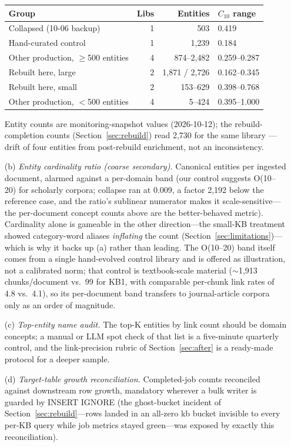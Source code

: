 \documentclass[preprint,12pt]{elsarticle}
\begin{document}
\begin{itemize}
\begin{center}
\small
\begin{tabular}{@{}lrrl@{}}
\toprule
Group & Libs & Entities & $C_{10}$ range \\
\midrule
Collapsed (10-06 backup) & 1 & 503 & 0.419 \\
Hand-curated control & 1 & 1{,}239 & 0.184 \\
Other production, $\geq$500 entities & 4 & 874--2{,}482 & 0.259--0.287 \\
Rebuilt here, large & 2 & 1{,}871 / 2{,}726 & 0.162--0.345 \\
Rebuilt here, small & 2 & 153--629 & 0.398--0.768 \\
Other production, $<$500 entities & 4 & 5--424 & 0.395--1.000 \\
\bottomrule
\end{tabular}
\begin{flushleft}\footnotesize Entity counts are monitoring-snapshot
values (2026-10-12); the rebuild-completion counts
(Section~\ref{sec:rebuild}) read 2{,}730 for the same library ---
drift of four entities from post-rebuild enrichment, not an
inconsistency.
\end{flushleft}
\end{center}

\item[(b)] \emph{Entity cardinality ratio (coarse secondary).} Canonical
entities per ingested document, alarmed against a per-domain band (our
control suggests O(10--20) for scholarly corpora; collapse ran at 0.009, a factor 2{,}192 below the reference
case, and the ratio's sublinear numerator makes it scale-sensitive---the
per-document concept counts above are the better-behaved metric).
Cardinality alone is gameable in the other direction---the small-KB
treatment showed category-word aliases \emph{inflating} the count
(Section~\ref{sec:limitations})---which is why it backs up (a) rather
than leading. The O(10--20) band itself comes from a single
hand-evolved control library and is offered as illustration, not a
calibrated norm; that control is textbook-scale material
(${\sim}$1{,}913 chunks/document vs.\ 99 for KB1, with comparable
per-chunk link rates of 4.8 vs.\ 4.1), so its per-document band
transfers to journal-article corpora only as an order of magnitude.
\item[(c)] \emph{Top-entity name audit.} The top-K entities by link count
should be domain concepts; a manual or LLM spot check of that list is a
five-minute quarterly control, and the link-precision rubric of
Section~\ref{sec:after} is a ready-made protocol for a deeper sample.
\item[(d)] \emph{Target-table growth reconciliation.} Completed-job
counts reconciled against downstream row growth, mandatory wherever a
bulk writer is guarded by INSERT IGNORE (the ghost-bucket incident of
Section~\ref{sec:rebuild}---rows landed in an all-zero kb bucket
invisible to every per-KB query while job metrics stayed green---was
exposed by exactly this reconciliation).
\end{itemize}
\end{document}
